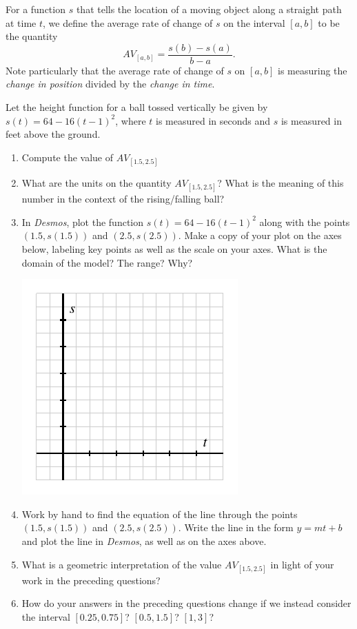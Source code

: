 \documentclass[nooutcomes]{ximera}
\begin{document}
For a function \(s\) that tells the location of a moving object along a straight path at time \(t\), we define the average rate of change of \(s\) on the interval \([a,b]\) to be the quantity%
\begin{equation*}
AV_{[a,b]} = \frac{s(b)-s(a)}{b-a}\text{.}
\end{equation*}
 Note particularly that the average rate of change of \(s\) on \([a,b]\) is measuring the \emph{change in position} divided by the \emph{change in time}.%

\begin{exploration}
Let the height function for a ball tossed vertically be given by \(s(t) = 64 - 16(t-1)^2\), where \(t\) is measured in seconds and \(s\) is measured in feet above the ground.
\begin{enumerate}[label=\alph*.]
\item Compute the value of \(AV_{[1.5,2.5]}\)
\item What are the units on the quantity \(AV_{[1.5,2.5]}\)? What is the meaning of this number in the context of the rising/falling ball?
\item In \emph{Desmos}, plot the function \(s(t) = 64 - 16(t-1)^2\) along with the points \((1.5,s(1.5))\) and \((2.5, s(2.5))\). Make a copy of your plot on the axes below, labeling key points as well as the scale on your axes. What is the domain of the model? The range? Why?
\begin{image}
\includegraphics{aroc-s-t-blank-axes}
\end{image}
\item Work by hand to find the equation of the line through the points \((1.5,s(1.5))\) and \((2.5, s(2.5))\). Write the line in the form \(y = mt + b\) and plot the line in \emph{Desmos}, as well as on the axes above.
\item What is a geometric interpretation of the value \(AV_{[1.5,2.5]}\) in light of your work in the preceding questions?
\item How do your answers in the preceding questions change if we instead consider the interval \([0.25, 0.75]\)? \([0.5, 1.5]\)? \([1,3]\)?
\end{enumerate}
\end{exploration}
\end{document}
